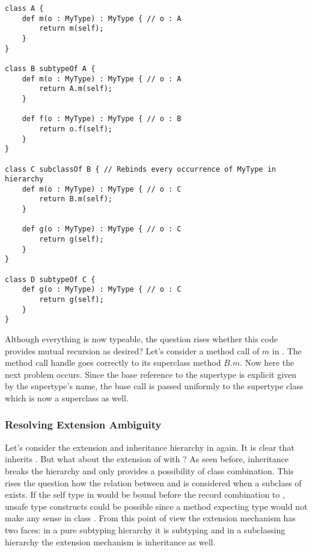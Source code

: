 \begin{lstlisting}[float=ht,language=ooplss,caption=Binding of \self and \mytype in a mixed context.,label=lst:bindingInMixedHierarchy]
class A {
	def m(o : MyType) : MyType { // o : A
		return m(self);
	}
}

class B subtypeOf A {
	def m(o : MyType) : MyType { // o : A
		return A.m(self);
	}

	def f(o : MyType) : MyType { // o : B
		return o.f(self);
	}
}

class C subclassOf B { // Rebinds every occurrence of MyType in hierarchy
	def m(o : MyType) : MyType { // o : C
		return B.m(self);
	}

	def g(o : MyType) : MyType { // o : C
		return g(self);
	}
}

class D subtypeOf C {
	def g(o : MyType) : MyType { // o : C
		return g(self);
	}
}
\end{lstlisting}

Although everything is now typeable, the question rises whether this code
provides mutual recursion as desired? Let's consider a method call of $m$
in \C. The method call handle goes correctly to its superclass method
$B.m$. Now here the next problem occurs. Since the base reference
to the supertype is explicit given by the supertype's name, the base call
is passed uniformly to the supertype class which is now a superclass as well.

%

\subsubsection{Resolving Extension Ambiguity}
\label{sec:resolveAmbiguity}
Let's consider the extension and inheritance hierarchy in 
again. It is clear that \C inherits \B. But what about the extension of \A
with \B? As seen before, inheritance breaks the hierarchy and only
provides a possibility of class combination. This rises the question how the
relation between \A and \B is considered when a subclass of \B exists. If
the self type in \A would be bound before the record combination to
\C, unsafe type constructs could be possible since a
method expecting type \A would not make any sense in class \C. From this
point of view the extension mechanism has two faces: in a pure
subtyping hierarchy it is subtyping and in a subclassing hierarchy the
extension mechanism is inheritance as well.

